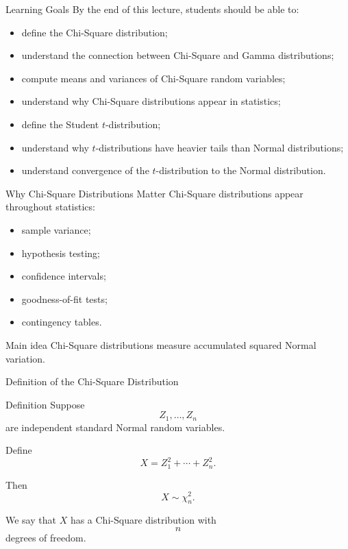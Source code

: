 \setcounter{framenumber}{0}

\begin{frame}
  \titlepage
\end{frame}

\begin{frame}{Learning Goals}
By the end of this lecture, students should be able to:
\begin{itemize}
    \item define the Chi-Square distribution;
    \item understand the connection between Chi-Square and Gamma distributions;
    \item compute means and variances of Chi-Square random variables;
    \item understand why Chi-Square distributions appear in statistics;
    \item define the Student \(t\)-distribution;
    \item understand why \(t\)-distributions have heavier tails than Normal distributions;
    \item understand convergence of the \(t\)-distribution to the Normal distribution.
\end{itemize}
\end{frame}


\begin{frame}{Why Chi-Square Distributions Matter}
Chi-Square distributions appear throughout statistics:
\begin{itemize}
    \item sample variance;
    \item hypothesis testing;
    \item confidence intervals;
    \item goodness-of-fit tests;
    \item contingency tables.
\end{itemize}

\vspace{0.25cm}

\begin{keybox}{Main idea}
Chi-Square distributions measure accumulated squared Normal variation.
\end{keybox}
\end{frame}

\begin{frame}{Definition of the Chi-Square Distribution}
\begin{keybox}{Definition}
Suppose
\[
Z_1,\dots,Z_n
\]
are independent standard Normal random variables.

Define
\[
X
=
Z_1^2+\cdots+Z_n^2.
\]

Then
\[
\boxed{
X\sim \chi_n^2.
}
\]

We say that \(X\) has a Chi-Square distribution with
\[
n
\]
degrees of freedom.
\end{keybox}
\end{frame}

